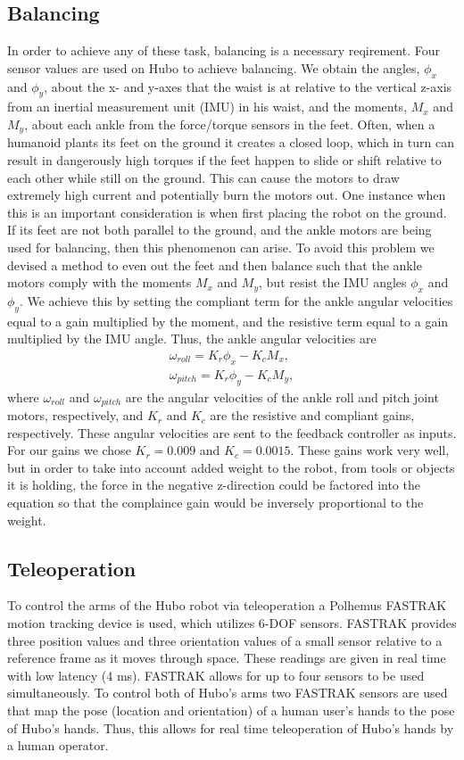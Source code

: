 \documentclass[letterpaper, 10 pt, conference]{IEEEtran}
\begin{document}
\subsection{Balancing} \label{subsec:balancing}
In order to achieve any of these task, balancing is a necessary reqirement. Four sensor values are used on Hubo to  achieve balancing. We obtain the angles, $\phi_x$ and $\phi_y$, about the x- and y-axes that the waist is at relative to the vertical z-axis from an inertial measurement unit (IMU) in his waist, and the moments, $M_x$ and $M_y$, about each ankle from the force/torque sensors in the feet. Often, when a humanoid plants its feet on the ground it creates a closed loop, which in turn can result in dangerously high torques if the feet happen to slide or shift relative to each other while still on the ground. This can cause the motors to draw extremely high current and potentially burn the motors out. One instance when this is an important consideration is when first placing the robot on the ground. If its feet are not both parallel to the ground, and the ankle motors are being used for balancing, then this phenomenon can arise. To avoid this problem we devised a method to even out the feet and then balance such that the ankle motors comply with the moments $M_x$ and $M_y$, but resist the IMU angles $\phi_x$ and $\phi_y$. We achieve this by setting the compliant term for the ankle angular velocities equal to a gain multiplied by the moment, and the resistive term equal to a gain multiplied by the IMU angle. Thus, the ankle angular velocities are
\begin{align}
\omega_{roll} = K_r\phi_x - K_cM_x, \\
\omega_{pitch} = K_r\phi_y - K_cM_y,
\end{align}
where $\omega_{roll}$ and $\omega_{pitch}$ are the angular velocities of the ankle roll and pitch joint motors, respectively, and $K_r$ and $K_c$ are the resistive and compliant gains, respectively. These angular velocities are sent to the feedback controller as inputs. For our gains we chose $K_{r}=0.009$ and $K_{c}=0.0015$. These gains work very well, but in order to take into account added weight to the robot, from tools or objects it is holding, the force in the negative z-direction could be factored into the equation so that the complaince gain would be inversely proportional to the weight.

\subsection{Teleoperation} \label{subsec:teleoperation}
To control the arms of the Hubo robot via teleoperation a Polhemus FASTRAK motion tracking device is used, which utilizes 6-DOF sensors. FASTRAK provides three position values and three orientation values of a small sensor relative to a reference frame as it moves through space. These readings are given in real time with low latency (4 ms). FASTRAK allows for up to four sensors to be used simultaneously. To control both of Hubo's arms two FASTRAK sensors are used that map the pose (location and orientation) of a human user's hands to the pose of Hubo's hands. Thus, this allows for real time teleoperation of Hubo's hands by a human operator.
\end{document}
